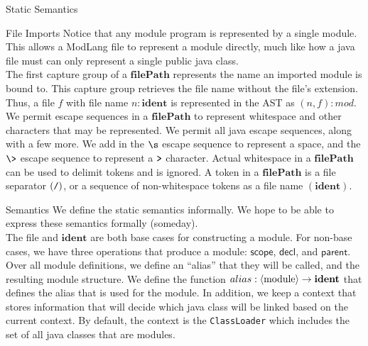 \documentclass[11pt]{article}
\newcommand\IDENT{\textbf{ident}}
\newcommand\FILEPATH{\textbf{filePath}}
\newcommand\nonterm[1]{\langle\textnormal{#1}\rangle}
\begin{document}
\begin{section}{Static Semantics}


\begin{subsection}{File Imports}
Notice that any module program is represented by a single module. This allows a ModLang file to represent a module directly, much like how a java file must can only represent a single public java class. \\

The first capture group of a $\FILEPATH$ represents the name an imported module is bound to. This capture group retrieves the file name without the file's extension. Thus, a file $f$ with file name $n : \IDENT$ is represented in the AST as $(n, f) : mod$.\\

We permit escape sequences in a $\FILEPATH$ to represent whitespace and other characters that may be represented. We permit all java escape sequences, along with a few more. We add in the $\verb|\s|$ escape sequence to represent a space, and the $\verb|\>|$ escape sequence to represent a $\verb|>|$ character. Actual whitespace in a $\FILEPATH$ can be used to delimit tokens and is ignored. A token in a $\FILEPATH$ is a file separator $(\verb|/|)$, or a sequence of non-whitespace tokens as a file name $(\IDENT)$.\\
\end{subsection}

\begin{subsection}{Semantics}
We define the static semantics informally. We hope to be able to express these semantics formally (someday).\\

The \textsf{file} and $\IDENT$ are both base cases for constructing a module. For non-base cases, we have three operations that produce a module: $\textsf{scope}$, $\textsf{decl}$, and $\textsf{parent}$. Over all module definitions, we define an ``alias'' that they will be called, and the resulting module structure. We define the function $alias : \nonterm{module} \rightarrow \IDENT$ that defines the alias that is used for the module. In addition, we keep a context that stores information that will decide which java class will be linked based on the current context. By default, the context is the \verb|ClassLoader| which includes the set of all java classes that are modules.\\


\end{subsection}
\end{section}
\end{document}
